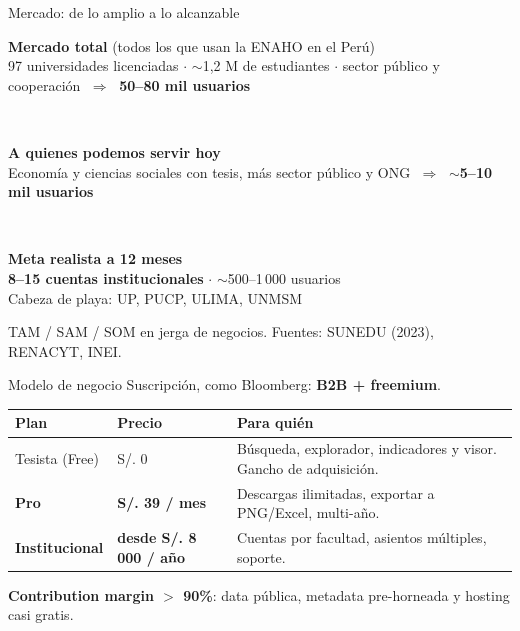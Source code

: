 \documentclass[aspectratio=169,11pt]{beamer}
\begin{document}
\begin{frame}{Mercado: de lo amplio a lo alcanzable}
  \begin{center}
  \setlength{\fboxsep}{6pt}
  \colorbox{AzulStats}{\parbox{0.93\textwidth}{\centering\color{white}
    \textbf{Mercado total}\; (todos los que usan la ENAHO en el Perú)\\[1pt]
    \small 97 universidades licenciadas $\cdot$ $\sim$1,2 M de estudiantes $\cdot$ sector público y
    cooperación $\;\Rightarrow\;$ \textbf{50--80 mil usuarios}}}\\[5pt]
  \colorbox{AzulClaro}{\parbox{0.72\textwidth}{\centering\color{white}
    \textbf{A quienes podemos servir hoy}\\[1pt]
    \small Economía y ciencias sociales con tesis, más sector público y ONG
    $\;\Rightarrow\;$ \textbf{$\sim$5--10 mil usuarios}}}\\[5pt]
  \colorbox{NaranjaStats}{\parbox{0.66\textwidth}{\centering\color{white}
    \textbf{Meta realista a 12 meses}\\[1pt]
    \small \textbf{8--15 cuentas institucionales} $\cdot$ $\sim$500--1\,000 usuarios\\
    Cabeza de playa: UP, PUCP, ULIMA, UNMSM}}
  \end{center}
  \vspace{0.15cm}
  {\footnotesize\color{GrisSuave}TAM / SAM / SOM en jerga de negocios. \;Fuentes: SUNEDU (2023), RENACYT, INEI.}
\end{frame}

\begin{frame}{Modelo de negocio}
  Suscripción, como Bloomberg: \textbf{B2B + freemium}.\par
  \vspace{0.25cm}
  \begin{center}\small
  \renewcommand{\arraystretch}{1.2}
  \begin{tabular}{>{\raggedright}p{3.2cm} l >{\raggedright\arraybackslash}p{6.4cm}}
    \toprule
    \textbf{\color{AzulStats}Plan} & \textbf{\color{AzulStats}Precio} & \textbf{\color{AzulStats}Para quién} \\
    \midrule
    Tesista (Free) & S/. 0 & Búsqueda, explorador, indicadores y visor. Gancho de adquisición. \\
    \textbf{Pro} & \textbf{S/. 39 / mes} & Descargas ilimitadas, exportar a PNG/Excel, multi-año. \\
    \textbf{Institucional} & \textbf{desde S/. 8\,000 / año} & Cuentas por facultad, asientos múltiples, soporte. \\
    \bottomrule
  \end{tabular}
  \end{center}
  \vspace{0.2cm}
  {\small{\color{AzulStats}\textbf{Contribution margin $>$ 90\%}}: data pública, metadata pre-horneada y hosting casi gratis.}
\end{frame}
\end{document}
